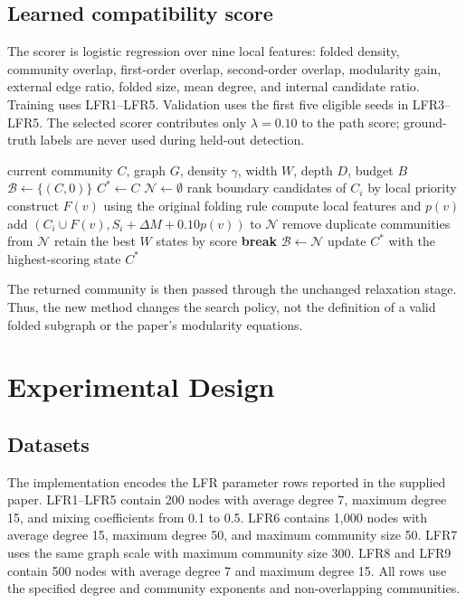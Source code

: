 \documentclass[10pt,journal,compsoc]{IEEEtran}
\begin{document}
\subsection{Learned compatibility score}
The scorer is logistic regression over nine local features: folded density,
community overlap, first-order overlap, second-order overlap, modularity gain,
external edge ratio, folded size, mean degree, and internal candidate ratio.
Training uses LFR1--LFR5. Validation uses the first five eligible seeds in
LFR3--LFR5. The selected scorer contributes only $\lambda=0.10$ to the path
score; ground-truth labels are never used during held-out detection.

\begin{algorithm}[t]
\caption{Adaptive candidate-budget beam expansion}
\label{alg:adaptive}
\begin{algorithmic}[1]
\REQUIRE current community $C$, graph $G$, density $\gamma$, width $W$,
depth $D$, budget $B$
\STATE $\mathcal{B}\leftarrow\{(C,0)\}$
\STATE $C^*\leftarrow C$
  \STATE $\mathcal{N}\leftarrow\emptyset$
    \STATE rank boundary candidates of $C_i$ by local priority
      \STATE construct $F(v)$ using the original folding rule
        \STATE compute local features and $p(v)$
        \STATE add $(C_i\cup F(v),S_i+\Delta M+0.10p(v))$ to $\mathcal{N}$
      \ENDIF
    \ENDFOR
  \ENDFOR
  \STATE remove duplicate communities from $\mathcal{N}$
  \STATE retain the best $W$ states by score
   \STATE \textbf{break} \ENDIF
  \STATE $\mathcal{B}\leftarrow\mathcal{N}$
  \STATE update $C^*$ with the highest-scoring state
\ENDFOR
\RETURN $C^*$
\end{algorithmic}
\end{algorithm}

The returned community is then passed through the unchanged relaxation stage.
Thus, the new method changes the search policy, not the definition of a valid
folded subgraph or the paper's modularity equations.

\section{Experimental Design}
\subsection{Datasets}
The implementation encodes the LFR parameter rows reported in the supplied
paper. LFR1--LFR5 contain 200 nodes with average degree 7, maximum degree 15,
and mixing coefficients from 0.1 to 0.5. LFR6 contains 1,000 nodes with
average degree 15, maximum degree 50, and maximum community size 50. LFR7
uses the same graph scale with maximum community size 300. LFR8 and LFR9
contain 500 nodes with average degree 7 and maximum degree 15. All rows use
the specified degree and community exponents and non-overlapping communities.
\end{document}
